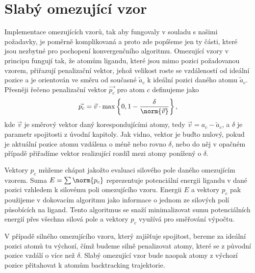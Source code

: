 \section{Slabý omezující vzor} \label{subsec:weak_pattern}
Implementace omezujících vzorů, tak aby fungovaly v souladu s našimi požadavky,
je poměrně komplikovaná a proto zde popíšeme jen ty části, které jsou nezbytné
pro pochopení konvergenčního algoritmu. Omezující vzory v principu fungují tak,
že atomům ligandu, které jsou mimo pozici požadovanou vzorem, přiřazují
penalizační vektor, jehož velikost roste se vzdáleností od ideální pozice
a je orientován ve směru od současné $ \tilde{a}_c $ k ideální pozici daného
atomu $ \tilde{a}_c $. Přesněji řečeno penalizační vektor $ \vec{p_c} $ pro
atom $ c $ definujeme jako
\begin{align*}
    \vec{p_c} = \vec{v} \cdot \max\left\{ 0, 1 - \frac{\delta}{\norm{\vec{v}}} \right\},
\end{align*}
kde $ \vec{v} $ je směrový vektor daný korespondujícími atomy, tedy
$ \vec{v} = a_c - \tilde{a}_c $, a $ \delta $ je parametr spojitosti z úvodní
kapitoly. Jak vidno, vektor je buďto nulový, pokud je aktuální pozice atomu vzdálena
o méně nebo rovno $ \delta $, nebo do něj v opačném případě přiřadíme vektor
realizující rozdíl mezi atomy ponížený o $ \delta $.

Vektory $ p_c $ můžeme chápat jakožto evaluaci silového pole daného omezujícím
vzorem. Suma $ E = \sum \norm{p_c} $ reprezentuje potenciální energii
ligandu v dané pozici vzhledem k silovému poli omezujícího vzoru. Energii $ E $
a vektory $ p_c $ pak použijeme v dokovacím algoritmu jako informace o jednom
ze silových polí působících na ligand. Tento algoritmus se snaží minimalizovat sumu
potenciálních energií přes všechna silová pole a vektory $ p_c $ využívá pro
směřování výpočtu.

V případě silného omezujícího vzoru, který zajišťuje spojitost, bereme za
ideální pozici atomů tu výchozí, čímž budeme silně penalizovat atomy, které se
z původní pozice vzdálí o více než $ \delta $. Slabý omezující vzor bude naopak
atomy z výchozí pozice přitahovat k atomům backtracking trajektorie.
